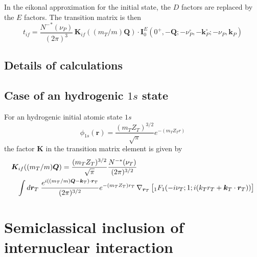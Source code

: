 In the eikonal approximation for the initial state, the $D$ factors are
replaced by the $E$ factors. The transition matrix is then
\begin{equation}\label{Q:tif-eis}
t_{if} = \frac{{N^{-}}^{*}(\nu_{P})}{(2 \pi)^{3}}\,
\bm{K}_{if}((m_{T}/m)\bm{Q}) \cdot \bm{I}^{E}_{0}( 0^{+} , -\bm{Q};
-\nu_{P}^{\circ}, -\bm{k}_{P}^{\circ};-\nu_{P},\bm{k}_{P})
\end{equation}

\subsection{Details of calculations}

\subsection*{Case of an hydrogenic $1s$ state}
For an hydrogenic initial atomic state $1s$
\[
\phi_{1s}(\bm{r}) = \frac{(m_{T} Z_{T})^{3/2}}{\sqrt{\pi}}
e^{-(m_{T} Z_{T} r)}
\]
%
the factor $\bm{K}$ in the transition matrix element is given by
\begin{eqnarray*}
\lefteqn{\bm{K}_{if}((m_{T}/m)\bm{Q}) = \frac{(m_{T}
Z_{T})^{3/2}}{\sqrt{\pi}} \frac{N^{-*}(\nu_{T})}{(2 \pi)^{3/2}}} \\
&&  \int d \bm{r}_{T} \; \frac{e^{i ((m_{T}/m)\bm{Q} -
\bm{k}_{T}) \cdot \bm{r}_{T}}}{(2 \pi)^{3/2}} e^{-
(m_{T}Z_{T})r_{T}}\, \nabla_{\bm{r}_{T}} \left[ {_{1}F_{1}}( -i
\nu_{T}; 1; i(k_{T} r_{T} + \bm{k}_{T} \cdot \bm{r}_{T}) ) \vstretch
\right]
\end{eqnarray*}

\section{Semiclassical inclusion of internuclear interaction}

